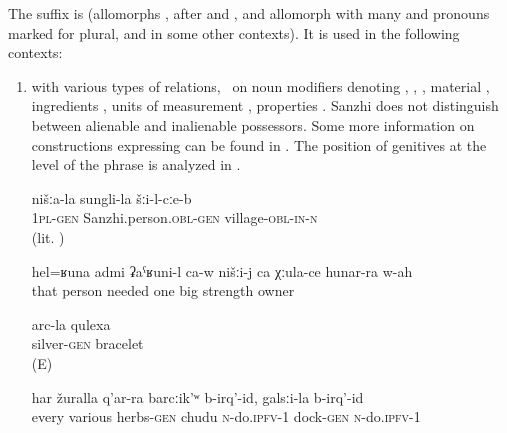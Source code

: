The  suffix is  (allomorphs ,  after  and , and allomorph  with many  and pronouns marked for plural, and in some other contexts). It is used in the following contexts:

\begin{enumerate}
	\item	with various types of relations, \teg\ on noun modifiers denoting  , , , material , ingredients , units of measurement , properties . Sanzhi does not distinguish between alienable and inalienable possessors. Some more information on constructions expressing  can be found in . The position of genitives at the level of the phrase is analyzed in .
	\begin{exe}
	
		\ex	\label{ex:in our village of Sanzhi}
		\gll	nišːa-la	sungli-la	šːi-l-cːe-b\\
			\textsc{1pl-gen}	Sanzhi.person.\textsc{obl}-\textsc{gen}	village-\textsc{obl-in}-\textsc{n}\\
		\glt	{} (lit. )
		
		
	\ex	\label{ex:‎We need such a man, one with huge strength}
	\gll	hel=ʁuna	admi	ʡaˁʁuni-l	ca-w	nišːi-j	ca	χːula-ce	hunar-ra w-ah\\
		that	person	needed				one	big	strength	owner\\
	\glt	{}
		
		
		\ex	\label{ex:silver bracelet}
		\gll	arc-la qulexa\\
			silver-\textsc{gen} bracelet\\
		\glt	{} (E)

		\ex	\label{ex:We make chudu from all various herbs, we make it from dock}
		\gll	har	žuralla	q'ar-ra	barcːik'ʷ	b-irq'-id,	galsːi-la	b-irq'-id\\
			every	various	herbs-\textsc{gen}	chudu	\textsc{n}-do.\textsc{ipfv}-1	dock-\textsc{gen}	\textsc{n}-do.\textsc{ipfv}-1\\
		\glt	{}


\end{exe}
\end{enumerate}
